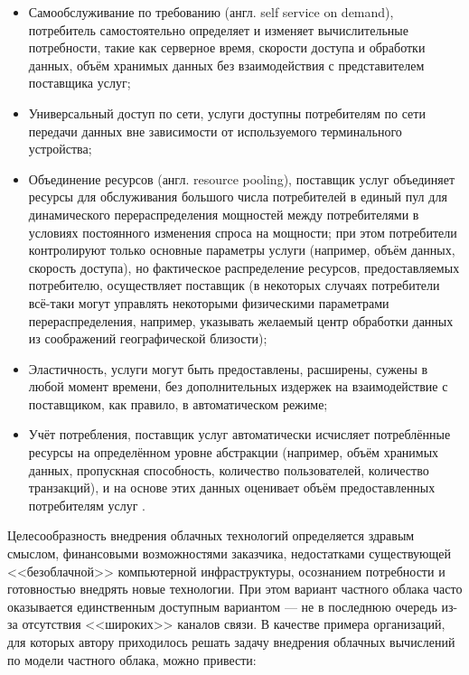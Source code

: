 \documentclass[10pt, a5paper]{article}
\begin{document}
\begin{itemize}
  \item Самообслуживание по требованию (англ. self service on \linebreak demand), потребитель самостоятельно определяет и изменяет вычислительные потребности, такие как серверное время, скорости доступа и обработки данных, объём хранимых данных без взаимодействия с представителем поставщика услуг;
  \item Универсальный доступ по сети, услуги доступны потребителям по сети передачи данных вне зависимости от используемого терминального устройства;
  \item Объединение ресурсов (англ. resource pooling), поставщик \linebreak услуг объединяет ресурсы для обслуживания большого числа потребителей в единый пул для динамического перераспределения мощностей между потребителями в условиях постоянного изменения спроса на мощности; при этом потребители контролируют только основные параметры услуги (например, объём данных, скорость доступа), но фактическое распределение ресурсов, предоставляемых потребителю, осуществляет поставщик (в некоторых случаях потребители всё-таки могут управлять некоторыми физическими параметрами перераспределения, например, указывать желаемый центр обработки данных из соображений географической близости);
  \item Эластичность, услуги могут быть предоставлены, расширены, сужены в любой момент времени, без дополнительных издержек на взаимодействие с поставщиком, как правило, в автоматическом режиме;
  \item Учёт потребления, поставщик услуг автоматически исчисляет потреблённые ресурсы на определённом уровне абстракции (например, объём хранимых данных, пропускная способность, количество пользователей, количество транзакций), и на основе этих данных оценивает объём предоставленных потребителям услуг \cite{Vankevich1}.
\end{itemize}

Целесообразность внедрения облачных технологий определяется здравым смыслом, финансовыми возможностями заказчика, \linebreak недостатками существующей <<безоблачной>> компьютерной инфраструктуры, осознанием потребности и готовностью внедрять новые технологии. При этом вариант частного облака часто оказывается единственным доступным вариантом --- не в последнюю очередь из-за отсутствия <<широких>> каналов связи. В качестве примера организаций, для которых автору приходилось решать задачу внедрения облачных вычислений по модели частного облака, можно привести:
\end{document}

